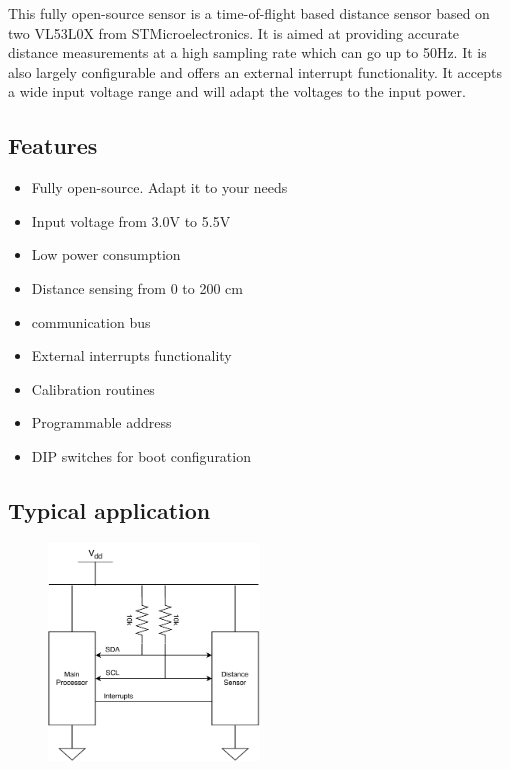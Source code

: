 \begin{multicols}{2}
 This fully open-source sensor is a time-of-flight based distance sensor based on two VL53L0X from STMicroelectronics. It is aimed at providing accurate distance measurements at a high sampling rate which can go up to 50Hz. It is also largely configurable and offers an external interrupt functionality. It accepts a wide input voltage range and will adapt the \iic voltages to the input power.
 \columnbreak
 \subsection{Features}
 \begin{itemize}
  \item Fully open-source. Adapt it to your needs
  \item Input voltage from 3.0V to 5.5V
  \item Low power consumption
  \item Distance sensing from 0 to 200 cm
  \item \iic communication bus
  \item External interrupts functionality
  \item Calibration routines
  \item Programmable \iic address
  \item DIP switches for boot configuration
 \end{itemize}
\end{multicols}

\subsection{Typical application}

\begin{figure}[h]
 \centering
 \includegraphics[width=0.5\textwidth]{../img/dual-vl53l0x-sensor.pdf}
\end{figure}